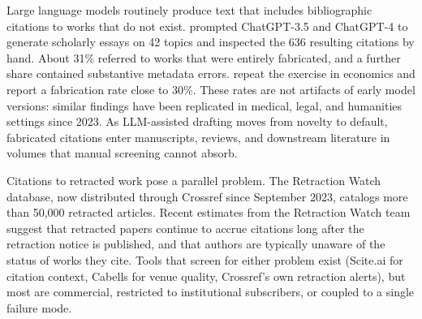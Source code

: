 \documentclass[12pt]{article}
\begin{document}
Large language models routinely produce text that includes bibliographic citations to works that do not exist. \citet{walters_wilder_2023} prompted ChatGPT-3.5 and ChatGPT-4 to generate scholarly essays on 42 topics and inspected the 636 resulting citations by hand. About 31\% referred to works that were entirely fabricated, and a further share contained substantive metadata errors. \citet{buchanan_hill_shapoval_2024} repeat the exercise in economics and report a fabrication rate close to 30\%. These rates are not artifacts of early model versions: similar findings have been replicated in medical, legal, and humanities settings since 2023. As LLM-assisted drafting moves from novelty to default, fabricated citations enter manuscripts, reviews, and downstream literature in volumes that manual screening cannot absorb.

Citations to retracted work pose a parallel problem. The Retraction Watch database, now distributed through Crossref since September 2023, catalogs more than 50{,}000 retracted articles. Recent estimates from the Retraction Watch team suggest that retracted papers continue to accrue citations long after the retraction notice is published, and that authors are typically unaware of the status of works they cite. Tools that screen for either problem exist (Scite.ai for citation context, Cabells for venue quality, Crossref's own retraction alerts), but most are commercial, restricted to institutional subscribers, or coupled to a single failure mode.
\end{document}
